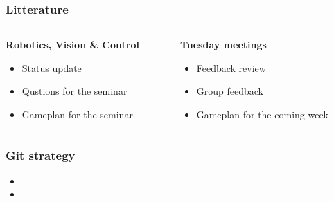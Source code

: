 \documentclass{beamer}
\begin{document}
\begin{frame}
    \frametitle{Litterature}
    \begin{columns}

        \begin{column}[]{0.5\textwidth}
            \textbf{Robotics, Vision \& Control }
            \begin{itemize}
                \item Status update
                \item Qustions for the seminar
                \item Gameplan for the seminar
            \end{itemize}
        \end{column}

        \begin{column}[]{.5\textwidth}
            \textbf{Tuesday meetings}
            \begin{itemize}
                \item Feedback review
                \item Group feedback
                \item Gameplan for the coming week
            \end{itemize}
        \end{column}

    \end{columns}
\end{frame}

\begin{frame}
    \frametitle{Git strategy}
    \begin{itemize}
        \item 
        \item 
    \end{itemize}
\end{frame}
\end{document}
